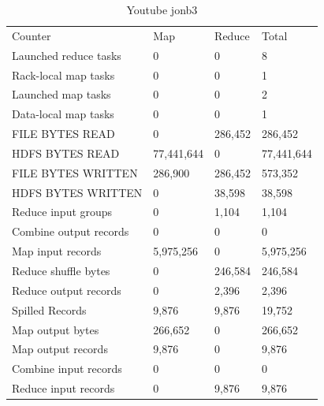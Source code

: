\documentclass[paper=a4, fontsize=11pt]{scrartcl}	%
\numberwithin{equation}{section}															%
\numberwithin{figure}{section}																%
\numberwithin{table}{section}																%
\begin{document}
\begin{table}[]
	\centering
	\caption{Youtube jonb3}
	\label{my-label}
	\begin{tabular}{llll}
		Counter&	Map	&Reduce	&Total\\
		Launched reduce tasks	&0	&0	&8\\
		Rack-local map tasks	&0	&0	&1\\
		Launched map tasks	&0	&0	&2\\
		Data-local map tasks	&0	&0	&1\\
		FILE BYTES READ	&0	&286,452	&286,452\\
		HDFS BYTES READ	&77,441,644	&0	&77,441,644\\
		FILE BYTES WRITTEN	&286,900	&286,452	&573,352\\
		HDFS BYTES WRITTEN	&0	&38,598	&38,598\\
		Reduce input groups	&0	&1,104	&1,104\\
		Combine output records	&0	&0	&0\\
		Map input records	&5,975,256	&0	&5,975,256\\
		Reduce shuffle bytes	&0	&246,584	&246,584\\
		Reduce output records	&0	&2,396	&2,396\\
		Spilled Records	&9,876	&9,876	&19,752\\
		Map output bytes	&266,652	&0	&266,652\\
		Map output records	&9,876	&0	&9,876\\
		Combine input records	&0	&0	&0\\
		Reduce input records	&0	&9,876	&9,876\\
		
	\end{tabular}
\end{table}
\end{document}
